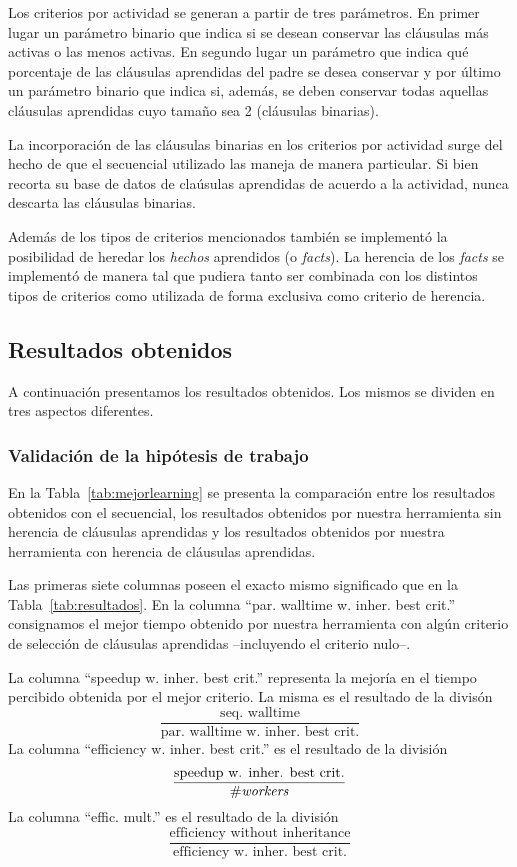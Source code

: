 Los criterios por actividad se generan a partir de tres parámetros. En primer
lugar un parámetro binario que indica si se desean conservar las cláusulas más
activas o las menos activas. En segundo lugar un parámetro que indica qué
porcentaje de las cláusulas aprendidas del padre se desea conservar y por
último un parámetro binario que indica si, además, se deben conservar todas
aquellas cláusulas aprendidas cuyo tamaño sea 2 (cláusulas binarias).

La incorporación de las cláusulas binarias en los criterios por actividad
surge del hecho de que el \ssolver secuencial utilizado las maneja de manera
particular. Si bien recorta su base de datos de claúsulas aprendidas de
acuerdo a la actividad, nunca descarta las cláusulas binarias.

Además de los tipos de criterios mencionados también se implementó la
posibilidad de heredar los \emph{hechos} aprendidos (o \emph{facts}). La
herencia de los \emph{facts} se implementó de manera tal que pudiera tanto ser
combinada con los distintos tipos de criterios como utilizada de forma
exclusiva como criterio de herencia.




\subsection{Resultados obtenidos}

A continuación presentamos los resultados obtenidos. Los mismos se dividen en
tres aspectos diferentes. 

\subsubsection{Validación de la hipótesis de trabajo}

En la Tabla~\ref{tab:mejorlearning} se presenta la comparación entre los
resultados obtenidos con el \ssolver secuencial, los resultados obtenidos por
nuestra herramienta sin herencia de cláusulas aprendidas y los resultados
obtenidos por nuestra herramienta con herencia de cláusulas aprendidas.

Las primeras siete columnas poseen el exacto mismo significado que en la
Tabla~\ref{tab:resultados}. En la columna ``par. walltime w. inher. best crit.'' consignamos
el mejor tiempo obtenido por nuestra herramienta con algún criterio de
selección de cláusulas aprendidas --incluyendo el criterio nulo--.

La columna ``speedup w. inher. best crit.'' representa la mejoría en el tiempo
percibido obtenida por el mejor criterio. La misma es el resultado de la
divisón $$\frac{\text{seq. walltime}}{\text{par. walltime w. inher. best
crit.}}$$ La columna ``efficiency w. inher. best crit.'' es el resultado de la
división $$\frac{\text{speedup w. inher. best crit.}}{\text{\#\emph{workers}}}$$ La
columna ``effic. mult.'' es el resultado de la división
$$\frac{\text{efficiency without inheritance}}{\text{efficiency w. inher. best
crit.}}$$

